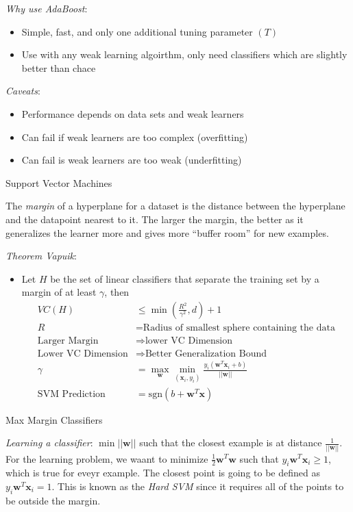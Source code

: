 \documentclass{article}
\newcommand{\Norm}[1]{\left|\left| #1\right|\right|}
\begin{document}
{\em Why use AdaBoost}:
\begin{itemize}
\item Simple, fast, and only one additional tuning parameter $(T)$
\item Use with any weak learning algoirthm, only need classifiers which are slightly better than chace
\end{itemize}

{\em Caveats}:
\begin{itemize}
\item Performance depends on data sets and weak learners
\item Can fail if weak learners are too complex (overfitting)
\item Can fail is weak learners are too weak (underfitting)
\end{itemize}

{\large Support Vector Machines}

The {\em margin} of a hyperplane for a dataset is the distance between the hyperplane and the datapoint nearest to it. The larger the margin, the better as it generalizes the learner more and gives more ``buffer room'' for new examples.

{\em Theorem Vapuik}:
\begin{itemize}
\item Let $H$ be the set of linear classifiers that separate the training set by a margin of at least $\gamma$, then
\begin{align}
VC(H) &\leq \min\left(\frac{R^{2}}{\gamma^{2}},d\right)+1\\
R &= \text{Radius of smallest sphere containing the data}\\
\text{Larger Margin} &\Rightarrow \text{lower VC Dimension}\\
\text{Lower VC Dimension} &\Rightarrow \text{Better Generalization Bound}\\
\gamma &= \max_{\mathbf{w}}\min_{(\mathbf{x}_{i},y_{i})}\frac{y_{i}(\mathbf{w}^{T}\mathbf{x}_{i}+b)}{\Norm{\mathbf{w}}}\\
\text{SVM Prediction} &= \text{sgn}(b+\mathbf{w}^{T}\mathbf{x})
\end{align}
\end{itemize}

{\large Max Margin Classifiers}

{\em Learning a classifier}: $\min\Norm{\mathbf{w}}$ such that the closest example is at distance $\frac{1}{\Norm{\mathbf{w}}}$. For the learning problem, we waant to minimize $\frac{1}{2}\mathbf{w}^{T}\mathbf{w}$ such that $y_{i}\mathbf{w}^{T}\mathbf{x}_{i}\geq 1$, which is true for eveyr example. The closest point is going to be defined as $y_{i}\mathbf{w}^{T}\mathbf{x}_{i}=1$. This is known as the {\em Hard SVM} since it requires all of the points to be outside the margin.
\end{document}
